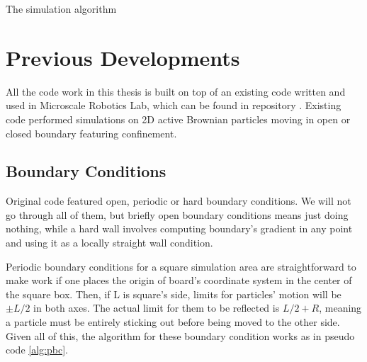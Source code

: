 \documentclass[../../master_thesis_np.tex]{subfiles}
\begin{document}
	\begin{algorithm}
		\caption{The simulation algorithm} \label{alg:sim1}	
		\begin{algorithmic}[1]
			\EndFor
			\EndFor
			\EndFor
		\end{algorithmic}
	\end{algorithm}  
	
	\section{Previous Developments}
	All the code work in this thesis is built on top of an existing code written and used in Microscale Robotics Lab, which can be found in repository \cite{sharma_simulations_2023}. Existing code performed simulations on 2D active Brownian particles moving in open or closed boundary featuring confinement. 
	
	\subsection{Boundary Conditions}
	Original code featured open, periodic or hard boundary conditions. We will not go through all of them, but briefly open boundary conditions means just doing nothing, while a hard wall involves computing boundary's gradient in any point and using it as a locally straight wall condition.
	
	Periodic boundary conditions for a square simulation area are straightforward to make work if one places the origin of board's coordinate system in the center of the square box. Then, if L is square's side, limits for particles' motion will be $\pm L/2$ in both axes. The actual limit for them to be reflected is $L/2 + R$, meaning a particle must be entirely sticking out before being moved to the other side. Given all of this, the algorithm for these boundary condition works as in pseudo code \ref{alg:pbc}.
	
\end{document}
